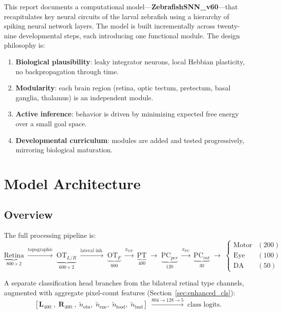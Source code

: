 \documentclass[11pt,a4paper]{article}
\begin{document}
This report documents a computational model---\textbf{ZebrafishSNN\_v60}---that
recapitulates key neural circuits of the larval zebrafish using a hierarchy of
spiking neural network layers.
The model is built incrementally across twenty-nine developmental steps, each
introducing one functional module.
The design philosophy is:
\begin{enumerate}[nosep]
  \item \textbf{Biological plausibility}: leaky integrator neurons, local
    Hebbian plasticity, no backpropagation through time.
  \item \textbf{Modularity}: each brain region (retina, optic tectum,
    pretectum, basal ganglia, thalamus) is an independent module.
  \item \textbf{Active inference}: behavior is driven by minimizing expected
    free energy over a small goal space.
  \item \textbf{Developmental curriculum}: modules are added and tested
    progressively, mirroring biological maturation.
\end{enumerate}

\section{Model Architecture}\label{sec:arch}

\subsection{Overview}

The full processing pipeline is:
\[
  \underbrace{\text{Retina}}_{\text{800}\times 2}
  \;\xrightarrow{\text{topographic}}\;
  \underbrace{\text{OT}_{L/R}}_{\text{600}\times 2}
  \;\xrightarrow{\text{lateral inh.}}\;
  \underbrace{\text{OT}_F}_{800}
  \;\xrightarrow{\pi_\text{OT}}\;
  \underbrace{\text{PT}}_{400}
  \;\rightarrow\;
  \underbrace{\text{PC}_{per}}_{120}
  \;\xrightarrow{\pi_\text{PC}}\;
  \underbrace{\text{PC}_{int}}_{30}
  \;\rightarrow\;
  \begin{cases}
    \text{Motor} & (200) \\
    \text{Eye}   & (100) \\
    \text{DA}    & (50)
  \end{cases}
\]

A separate classification head branches from the bilateral retinal type
channels, augmented with aggregate pixel-count features
(Section~\ref{sec:enhanced_cls}):
\[
  [\mathbf{L}_{400:},\; \mathbf{R}_{400:},\;
   \tilde{n}_\text{obs},\; \tilde{n}_\text{ene},\;
   \tilde{n}_\text{food},\; \tilde{n}_\text{bnd}]
  \;\xrightarrow{804 \to 128 \to 5}\;
  \text{class logits}.
\]
\end{document}
